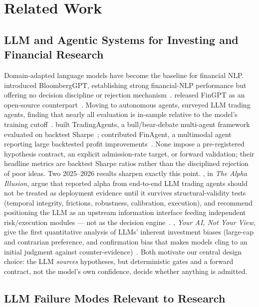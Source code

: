 \documentclass[11pt]{article}
\begin{document}
\section{Related Work}

\subsection{LLM and Agentic Systems for Investing and Financial Research}

Domain-adapted language models have become the baseline for financial NLP\@.
\citet{wu2023bloomberggpt} introduced BloombergGPT, establishing strong
financial-NLP performance but offering no decision discipline or rejection
mechanism~\citep{wu2023bloomberggpt}. \citet{yang2023fingpt} released FinGPT
as an open-source counterpart~\citep{yang2023fingpt}. Moving to autonomous
agents, \citet{ding2024llmagentfinance} surveyed LLM trading agents, finding
that nearly all evaluation is in-sample relative to the model's training
cutoff~\citep{ding2024llmagentfinance}. \citet{xiao2024tradingagents} built
TradingAgents, a bull/bear-debate multi-agent framework evaluated on backtest
Sharpe~\citep{xiao2024tradingagents}; \citet{zhang2024finagent} contributed
FinAgent, a multimodal agent reporting large backtested profit
improvements~\citep{zhang2024finagent}. None impose a pre-registered
hypothesis contract, an explicit admission-rate target, or forward validation;
their headline metrics are backtest Sharpe ratios rather than the disciplined
rejection of poor ideas. Two 2025--2026 results sharpen exactly this point.
\citet{ye2026alphaillusion}, in \emph{The Alpha Illusion}, argue that reported
alpha from end-to-end LLM trading agents should not be treated as deployment
evidence until it survives structural-validity tests (temporal integrity,
frictions, robustness, calibration, execution), and recommend positioning the
LLM as an upstream information interface feeding independent risk/execution
modules --- not as the decision engine~\citep{ye2026alphaillusion}.
\citet{lee2025yourai}, \emph{Your AI, Not Your View}, give the first
quantitative analysis of LLMs' inherent investment biases (large-cap and
contrarian preference, and confirmation bias that makes models cling to an
initial judgment against counter-evidence)~\citep{lee2025yourai}. Both motivate
our central design choice: the LLM \emph{sources} hypotheses, but deterministic
gates and a forward contract, not the model's own confidence, decide whether
anything is admitted.

\subsection{LLM Failure Modes Relevant to Research}
\end{document}
